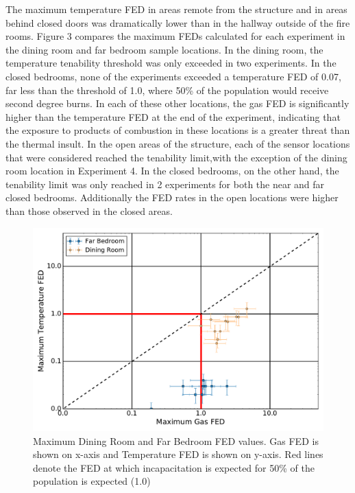 \documentclass[12pt,oneside]{article}
\begin{document}
The maximum temperature FED in areas remote from the structure and in areas behind closed doors was dramatically lower than in the hallway outside of the fire rooms. Figure 3 compares the maximum FEDs calculated for each experiment in the dining room and far bedroom sample locations. In the dining room, the temperature tenability threshold was only exceeded in two experiments. In the closed bedrooms, none of the experiments exceeded a temperature FED of 0.07, far less than the threshold of 1.0, where 50\% of the population would receive second degree burns. In each of these other locations, the gas FED is significantly higher than the temperature FED at the end of the experiment, indicating that the exposure to products of combustion in these locations is a greater threat than the thermal insult. In the open areas of the structure, each of the sensor locations that were considered reached the tenability limit,with the exception of the dining room location in Experiment 4. In the closed bedrooms, on the other hand, the tenability limit was only reached in 2 experiments for both the near and far closed bedrooms. Additionally the FED rates in the open locations were higher than those observed in the closed areas.
\begin{figure}[!ht]
	\centering
	\includegraphics[width=.75\textwidth]{../Figures/br_compare/Far}
	\caption[Maximum Dining Room and Far Bedroom FED values]{Maximum Dining Room and Far Bedroom FED values. Gas FED is shown on x-axis and Temperature FED is shown on y-axis. Red lines denote the FED at which incapacitation is expected for 50\% of the population is expected (1.0)}
	\label{fig:far_FED_compare}
\end{figure}

\end{document}
